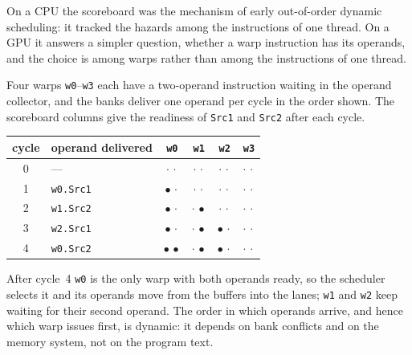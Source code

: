 \documentclass[../main.tex]{subfiles}
\begin{document}
On a CPU the scoreboard was the mechanism of early out-of-order dynamic
scheduling: it tracked the hazards among the instructions of one thread.
On a GPU it answers a simpler question, whether a warp instruction has
its operands, and the choice is among warps rather than among the
instructions of one thread.

\begin{example}
  \label{ex:l04-scoreboard}
  Four warps \texttt{w0}--\texttt{w3} each have a two-operand
  instruction waiting in the operand collector, and the banks deliver
  one operand per cycle in the order shown.  The scoreboard columns give
  the readiness of \texttt{Src1} and \texttt{Src2} after each cycle.
  \begin{center}
    \begin{tabular}{clcccc}
      \toprule
      cycle & operand delivered & \texttt{w0} & \texttt{w1} & \texttt{w2} & \texttt{w3} \\
      \midrule
      0 & --- & $\cdot\,\cdot$ & $\cdot\,\cdot$ & $\cdot\,\cdot$ & $\cdot\,\cdot$ \\
      1 & \texttt{w0.Src1} & $\bullet\,\cdot$ & $\cdot\,\cdot$ & $\cdot\,\cdot$ & $\cdot\,\cdot$ \\
      2 & \texttt{w1.Src2} & $\bullet\,\cdot$ & $\cdot\,\bullet$ & $\cdot\,\cdot$ & $\cdot\,\cdot$ \\
      3 & \texttt{w2.Src1} & $\bullet\,\cdot$ & $\cdot\,\bullet$ & $\bullet\,\cdot$ & $\cdot\,\cdot$ \\
      4 & \texttt{w0.Src2} & $\bullet\,\bullet$ & $\cdot\,\bullet$ & $\bullet\,\cdot$ & $\cdot\,\cdot$ \\
      \bottomrule
    \end{tabular}
  \end{center}
  After cycle~4 \texttt{w0} is the only warp with both operands ready,
  so the scheduler selects it and its operands move from the buffers
  into the lanes; \texttt{w1} and \texttt{w2} keep waiting for their
  second operand.  The order in which operands arrive, and hence which
  warp issues first, is dynamic: it depends on bank conflicts and on
  the memory system, not on the program text.
\end{example}
\end{document}
